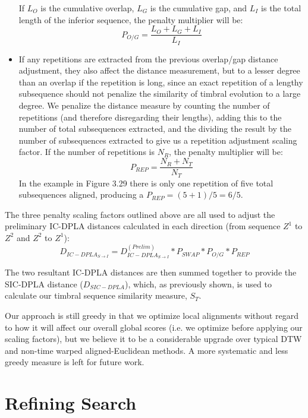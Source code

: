 \documentclass[12pt]{report} 	%
\numberwithin{figure}{chapter}
\numberwithin{table}{chapter}
\numberwithin{equation}{chapter}
\begin{document}
\begin{flushleft}
\begin{itemize}
\begin{figure}[h!]
\end{figure}
If $L_O$ is the cumulative overlap, $L_G$ is the cumulative gap, and $L_I$ is the total length of the inferior sequence, the penalty multiplier will be:
\begin{equation}
P_{O/G} = \frac{L_O+L_G+L_I}{L_I}
\end{equation}
\item If any repetitions are extracted from the previous overlap/gap distance adjustment, they also affect the distance measurement, but to a lesser degree than an overlap if the repetition is long, since an exact repetition of a lengthy subsequence should not penalize the similarity of timbral evolution to a large degree. We penalize the distance measure by counting the number of repetitions (and therefore disregarding their lengths), adding this to the number of total subsequences extracted, and the dividing the result by the number of subsequences extracted to give us a repetition adjustment scaling factor. If the number of repetitions is $N_R$, the penalty multiplier will be:
\begin{equation}
P_{REP} = \frac{N_R+N_T}{N_T}
\end{equation}
In the example in Figure 3.29 there is only one repetition of five total subsequences aligned, producing a $P_{REP}=(5+1)/5=6/5$.
\end{itemize}

The three penalty scaling factors outlined above are all used to adjust the preliminary IC-DPLA distances calculated in each direction (from sequence $Z^1$ to $Z^2$ and $Z^2$ to $Z^1$):
\begin{equation}
D_{IC-DPLA_{S \to I}} = D_{IC-DPLA_{S \to I}}^{(Prelim)} * P_{SWAP} * P_{O/G} * P_{REP}
\end{equation}

The two resultant IC-DPLA distances are then summed together to provide the SIC-DPLA distance ($D_{SIC-DPLA}$), which, as previously shown, is used to calculate our timbral sequence similarity measure, $S_T$.

Our approach is still greedy in that we optimize local alignments without regard to how it will affect our overall global scores (i.e. we optimize before applying our scaling factors), but we believe it to be a considerable upgrade over typical DTW and non-time warped aligned-Euclidean methods. A more systematic and less greedy measure is left for future work.

\section{Refining Search}

\end{flushleft}
\end{document}
